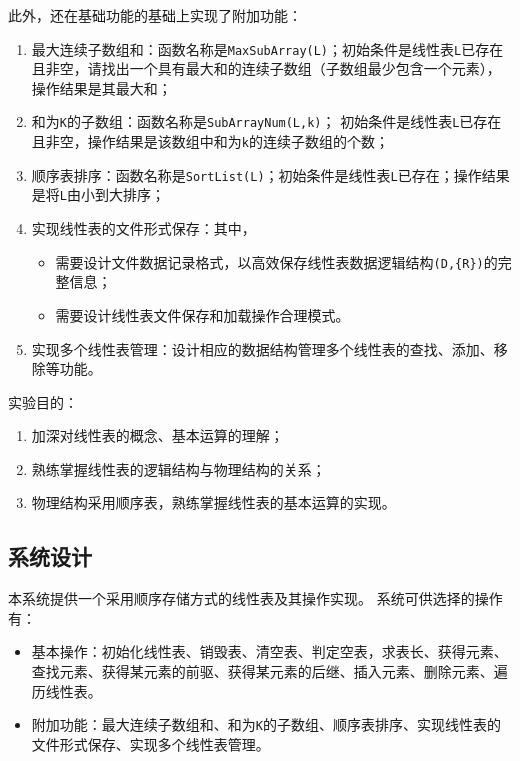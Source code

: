 \documentclass[supercite]{Experimental_Report}
\theoremstyle{definition}
\begin{document}
此外，还在基础功能的基础上实现了附加功能：
\begin{enumerate}
	\item 最大连续子数组和：函数名称是\verb|MaxSubArray(L)|；初始条件是线性表\verb|L|已存在且非空，请找出一个具有最大和的连续子数组（子数组最少包含一个元素），操作结果是其最大和；
	\item 和为\verb|K|的子数组：函数名称是\verb|SubArrayNum(L,k)|； 初始条件是线性表\verb|L|已存在且非空，操作结果是该数组中和为\verb|k|的连续子数组的个数；
	\item 顺序表排序：函数名称是\verb|SortList(L)|；初始条件是线性表\verb|L|已存在；操作结果是将\verb|L|由小到大排序；
	\item 实现线性表的文件形式保存：其中，
	\begin{itemize}
		\item 需要设计文件数据记录格式，以高效保存线性表数据逻辑结构\verb|(D,{R})|的完整信息；
		\item  需要设计线性表文件保存和加载操作合理模式。
	\end{itemize}
	\item 实现多个线性表管理：设计相应的数据结构管理多个线性表的查找、添加、移除等功能。
\end{enumerate}
实验目的：
\begin{enumerate}
	\item 加深对线性表的概念、基本运算的理解；
	\item 熟练掌握线性表的逻辑结构与物理结构的关系；
	\item 物理结构采用顺序表，熟练掌握线性表的基本运算的实现。
\end{enumerate}

\subsection{系统设计}
本系统提供一个采用顺序存储方式的线性表及其操作实现。
系统可供选择的操作有：
\begin{itemize}
	\item 基本操作：初始化线性表、销毁表、清空表、判定空表，求表长、获得元素、查找元素、获得某元素的前驱、获得某元素的后继、插入元素、删除元素、遍历线性表。
	\item 附加功能：最大连续子数组和、和为\verb|K|的子数组、顺序表排序、实现线性表的文件形式保存、实现多个线性表管理。
\end{itemize}
\end{document}
